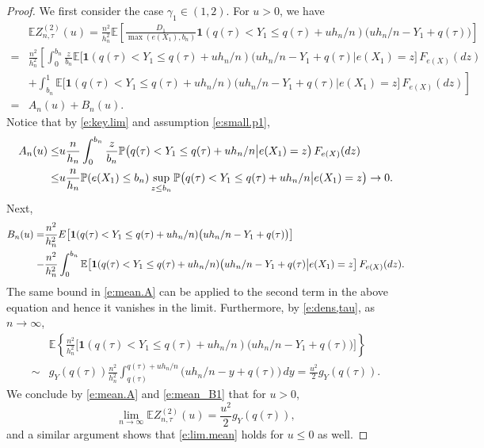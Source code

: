 \documentclass[12pt]{amsart}
\newcommand{\LFe}{F_{e(X)}}
\newcommand{\1}{\mathbbm{1}}
\newcommand{\0}{\mathbf{0}}
\newcommand{\one}{\mathbf{1}}
\newcommand{\E}{\mathbb{E}}
\theoremstyle{plain}
\theoremstyle{definition}
\newcommand{\bbP}{\mathbb{P}}
\begin{document}
\begin{proof}  We first consider the case $\gamma_1\in (1,2)$.  For $u>0$, we have
\begin{align*}
&\E Z^{(2)}_{n,\tau}(u) = \frac{n^2}{h_n^2}\E\left[   \frac{D_1}{\max(e(X_1),b_n)} \one
  (q(\tau)<Y_1\leq q(\tau)+uh_n/n) \bigl( uh_n/n-Y_1+q(\tau)\bigr)\right] \\
=&\frac{n^2}{h_n^2}\left[       \int_0^{b_n} \frac{z}{b_n} \E\bigl[  \one
  (q(\tau)<Y_1\leq q(\tau)+uh_n/n) \bigl( uh_n/n-Y_1+q(\tau)
   \big| e(X_1)=z\bigr]\, \LFe(dz)  \right. \\
  &\left.  + \int_{b_n}^1   \E\bigl[  \one
  (q(\tau)<Y_1\leq q(\tau)+uh_n/n) \bigl( uh_n/n-Y_1+q(\tau)
   \big| e(X_1)=z\bigr]\, \LFe(dz) 
\right] \\
=& A_n(u) +B_n(u). 
\end{align*}
Notice that by \eqref{e:key.lim} and assumption \eqref{e:small.p1}, 
\begin{align} \label{e:mean.A}
A_n(u) \leq& u\frac{n}{h_n} \int_0^{b_n} \frac{z}{b_n} \bbP
  \bigl(q(\tau)<Y_1\leq q(\tau)+uh_n/n  
   \big| e(X_1)=z\bigr)\, \LFe(dz) \\
\notag \leq& u\frac{n}{h_n} \bbP(e(X_1)\leq b_n)\sup_{z\leq b_n}\bbP
  \bigl(q(\tau)<Y_1\leq q(\tau)+uh_n/n  
   \big| e(X_1)=z\bigr) \to 0. 
\end{align}
Next,
\begin{align*} 
B_n(u) =& \frac{n^2}{h_n^2}E\bigl[  \one
  (q(\tau)<Y_1\leq q(\tau)+uh_n/n) \bigl(
  uh_n/n-Y_1+q(\tau)\bigr)\bigr]\\
\notag  -&
 \frac{n^2}{h_n^2} \int_0^{b_n}  \E\bigl[  \one
  (q(\tau)<Y_1\leq q(\tau)+uh_n/n) \bigl( uh_n/n-Y_1+q(\tau)
   \big| e(X_1)=z\bigr]\, \LFe(dz). 
\end{align*}
The same bound in \eqref{e:mean.A} can be applied to the second term in the above equation and hence it vanishes in the limit. Furthermore, by \eqref{e:dens,tau}, as $n\to\infty$, 
\begin{align} \label{e:mean_B1}
&\E\left\{\frac{n^2}{h_n^2}\bigl[  \one
  (q(\tau)<Y_1\leq q(\tau)+uh_n/n) \bigl(
  uh_n/n-Y_1+q(\tau)\bigr)\bigr]\right\} \\
\nonumber \sim & g_Y(q(\tau))
  \frac{n^2}{h_n^2}\int_{q(\tau)}^{q(\tau)+uh_n/n} (
  uh_n/n-y+q(\tau)\bigr)\, dy =\frac{u^2}{2}g_Y(q(\tau)). 
\end{align}
We conclude by \eqref{e:mean.A} and \eqref{e:mean_B1} that for $u>0$, 
\begin{equation} \label{e:lim.mean}
  \lim_{n\to\infty}\E Z^{(2)}_{n,\tau}(u) =
  \frac{u^2}{2}g_Y(q(\tau)), 
\end{equation}
and a similar argument shows that \eqref{e:lim.mean} holds for
$u\leq 0$ as well.


\end{proof}
\end{document}
